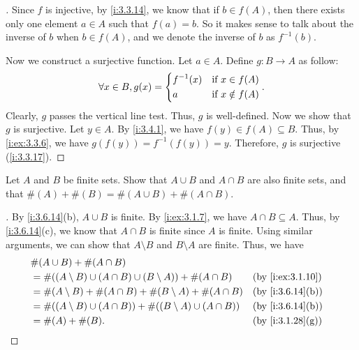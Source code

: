 \begin{proof}[]
  Since \(f\) is injective, by \cref{i:3.3.14}, we know that if \(b \in f(A)\), then there exists only one element \(a \in A\) such that \(f(a) = b\).
  So it makes sense to talk about the inverse of \(b\) when \(b \in f(A)\), and we denote the inverse of \(b\) as \(f^{-1}(b)\).

  Now we construct a surjective function.
  Let \(a \in A\).
  Define \(g : B \to A\) as follow:
  \[
    \forall x \in B, g(x) = \begin{dcases}
      f^{-1}(x) & \text{if } x \in f(A)    \\
      a         & \text{if } x \notin f(A)
    \end{dcases}.
  \]
  Clearly, \(g\) passes the vertical line test.
  Thus, \(g\) is well-defined.
  Now we show that \(g\) is surjective.
  Let \(y \in A\).
  By \cref{i:3.4.1}, we have \(f(y) \in f(A) \subseteq B\).
  Thus, by \cref{i:ex:3.3.6}, we have \(g(f(y)) = f^{-1}(f(y)) = y\).
  Therefore, \(g\) is surjective (\cref{i:3.3.17}).
\end{proof}

\begin{ex}\label{i:ex:3.6.9}
  Let \(A\) and \(B\) be finite sets.
  Show that \(A \cup B\) and \(A \cap B\) are also finite sets, and that \(\#(A) + \#(B) = \#(A \cup B) + \#(A \cap B)\).
\end{ex}

\begin{proof}[]
  By \cref{i:3.6.14}(b), \(A \cup B\) is finite.
  By \cref{i:ex:3.1.7}, we have \(A \cap B \subseteq A\).
  Thus, by \cref{i:3.6.14}(c), we know that \(A \cap B\) is finite since \(A\) is finite.
  Using similar arguments, we can show that \(A \setminus B\) and \(B \setminus A\) are finite.
  Thus, we have
  \begin{align*}
     & \#(A \cup B) + \#(A \cap B)                                                                       \\
     & = \#((A \setminus B) \cup (A \cap B) \cup (B \setminus A)) + \#(A \cap B)   &  & \by{i:ex:3.1.10} \\
     & = \#(A \setminus B) + \#(A \cap B) + \#(B \setminus A) + \#(A \cap B)       &  & \by{i:3.6.14}[b] \\
     & = \#((A \setminus B) \cup (A \cap B)) + \#((B \setminus A) \cup (A \cap B)) &  & \by{i:3.6.14}[b] \\
     & = \#(A) + \#(B).                                                            &  & \by{i:3.1.28}[g]
  \end{align*}
\end{proof}

